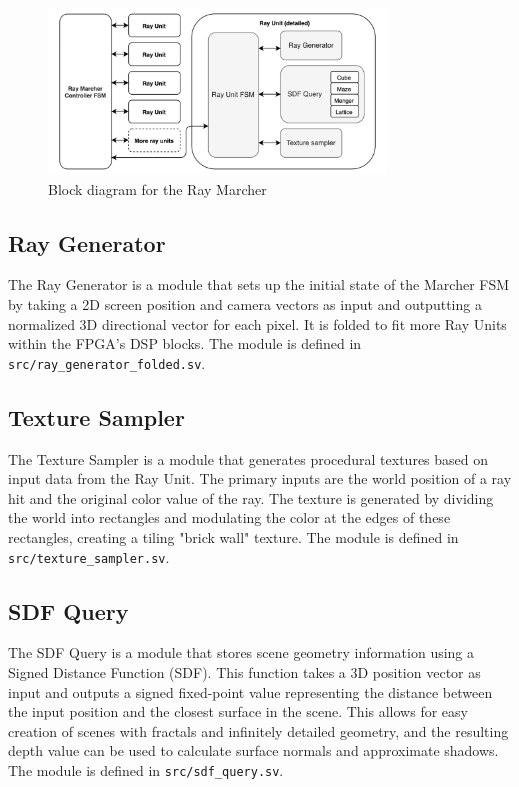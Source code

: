 \documentclass[conference]{IEEEtran}
\begin{document}
\begin{figure}
\centerline{\includegraphics[width=0.8\textwidth]{ray_block_diagram.png}}
\caption{Block diagram for the Ray Marcher}
\label{ray-block-diagram}
\end{figure}

\subsection{Ray Generator}

The Ray Generator is a module that sets up the initial state of the Marcher FSM by taking a 2D screen position and camera vectors as input and outputting a normalized 3D directional vector for each pixel. It is folded to fit more Ray Units within the FPGA's DSP blocks. The module is defined in \texttt{src/ray\_generator\_folded.sv}.


\subsection{Texture Sampler}

The Texture Sampler is a module that generates procedural textures based on input data from the Ray Unit. The primary inputs are the world position of a ray hit and the original color value of the ray. The texture is generated by dividing the world into rectangles and modulating the color at the edges of these rectangles, creating a tiling "brick wall" texture. The module is defined in \texttt{src/texture\_sampler.sv}.

\subsection{SDF Query}

The SDF Query is a module that stores scene geometry information using a Signed Distance Function (SDF). This function takes a 3D position vector as input and outputs a signed fixed-point value representing the distance between the input position and the closest surface in the scene. This allows for easy creation of scenes with fractals and infinitely detailed geometry, and the resulting depth value can be used to calculate surface normals and approximate shadows. The module is defined in \texttt{src/sdf\_query.sv}.
\end{document}
